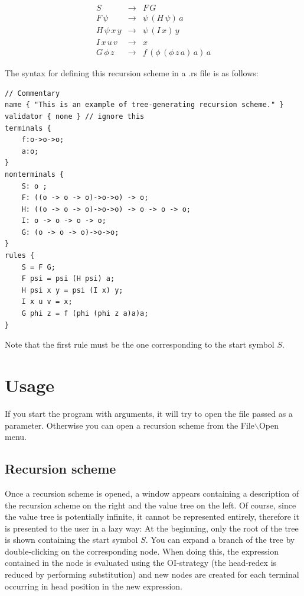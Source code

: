 \documentclass{article}
\begin{document}
\[\begin{array}{rll}
   S & \rightarrow & F\, G \\
    F\, \psi & \rightarrow &\psi\, (H\, \psi)\, a \\
    H\, \psi\, x\, y & \rightarrow & \psi\, (I\, x)\, y \\
    I\, x\, u\, v & \rightarrow & x \\
    G\, \phi\, z & \rightarrow &f\, (\phi\, (\phi\, z\, a)\,a)\,a
\end{array}\]

The syntax for defining this recursion scheme in a .rs file is as follows:

\begin{lstlisting}
// Commentary
name { "This is an example of tree-generating recursion scheme." }
validator { none } // ignore this
terminals {
    f:o->o->o;
    a:o;
}
nonterminals {
    S: o ;
    F: ((o -> o -> o)->o->o) -> o;
    H: ((o -> o -> o)->o->o) -> o -> o -> o;
    I: o -> o -> o -> o;
    G: (o -> o -> o)->o->o;
}
rules {
    S = F G;
    F psi = psi (H psi) a;
    H psi x y = psi (I x) y;
    I x u v = x;
    G phi z = f (phi (phi z a)a)a;
}
\end{lstlisting}

Note that the first rule must be the one corresponding to the start symbol $S$.

\section{Usage}

If you start the program with arguments, it will try to open the file passed as a parameter. Otherwise
you can open a recursion scheme from the File$\backslash$Open menu.

\subsection{Recursion scheme}

Once a recursion scheme is opened, a window appears containing a description of the recursion scheme on the right and the value tree on the left. Of course, since the value tree is potentially infinite, it cannot be represented entirely, therefore it is presented to the user in a lazy way: At the beginning, only the root of the tree is shown containing the start symbol $S$. You can expand a branch of the tree by double-clicking on the corresponding node. When doing this, the expression contained in the node is evaluated using the OI-strategy (the head-redex is reduced by performing substitution) and new nodes are created for each terminal occurring in head position in the new expression.
\end{document}
